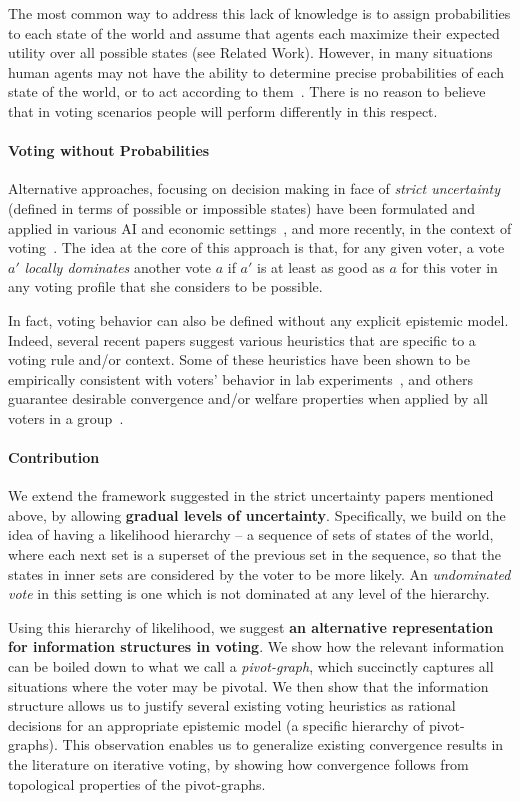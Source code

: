 \documentclass[letterpaper]{article} %
\begin{document}
The most common way to address this lack of knowledge is to assign probabilities to each state of the world and assume that agents each maximize their expected utility over all possible states (see Related Work). However, in many situations human agents may not have the ability to determine precise probabilities of each state of the world, or to act according to them~\cite{TK74,chater2006probabilistic}. There is no reason to believe that in voting scenarios people will perform differently in this respect.

\paragraph{Voting without Probabilities}
Alternative approaches, focusing on decision making in face of \emph{strict uncertainty} (defined in terms of possible or impossible states) have been formulated and applied in various AI and economic settings~\cite{dow1994nash,boutilier1994toward,Hal97,matt2009dominant}, and more recently, in the context of voting~\cite{CWX11,RE12,MLR14}. The idea at the core of this approach is that, for any given voter, a vote $a'$ \emph{locally dominates} another vote $a$ if $a'$ is at least as good as $a$ for this voter in any voting profile that she considers to be possible.

In fact, voting behavior can also be defined without any explicit epistemic model. Indeed, several recent papers suggest various heuristics that are specific to a voting rule and/or context. Some of these heuristics have been shown to be empirically consistent with voters' behavior in lab experiments~\cite{laslier2010laboratory}, and others guarantee desirable convergence and/or welfare properties when applied by all voters in a group~\cite{GLRVW13}.

\paragraph{Contribution}
We extend the framework suggested in the strict uncertainty papers mentioned above, by allowing \textbf{gradual levels of uncertainty}. Specifically, we build on the idea of having a likelihood hierarchy -- a sequence of sets of states of the world, where each next set is a superset of the previous set in the sequence, so that the states in inner sets are considered by the voter to be more likely. An \emph{undominated vote} in this setting is one which is not dominated at any level of the hierarchy.

Using this hierarchy of likelihood, we suggest \textbf{an alternative representation for information structures in voting}. We show how the relevant information can be boiled down to what we call a \emph{pivot-graph}, which succinctly captures all situations where the voter may be pivotal. We then show that the information structure allows us to justify several existing voting heuristics as rational decisions for an appropriate epistemic model (a specific hierarchy of pivot-graphs). This observation enables us to generalize existing convergence results in the literature on iterative voting, by showing how convergence follows from topological properties of the pivot-graphs.
\end{document}
